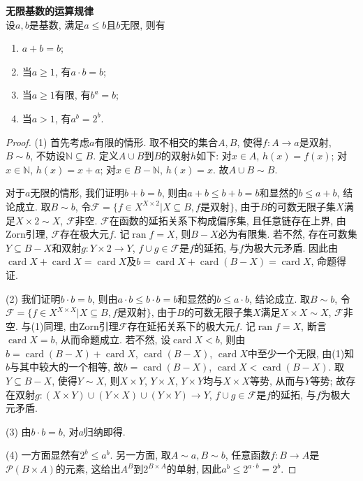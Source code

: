 \begin{pro}\textbf{无限基数的运算规律}\\
设$a,b$是基数, 满足$a\le b$且$b$无限, 则有
\begin{enumerate}
\item $a+b=b$;
\item 当$a\ge 1$, 有$a\cdot b=b$;
\item 当$a\ge 1$有限, 有$b^a=b$;
\item 当$a>1$, 有$a^b=2^b$.
\end{enumerate}
\end{pro}
\begin{proof}
(1) 首先考虑$a$有限的情形. 取不相交的集合$A,B$, 使得$f: A\to a$是双射, $B\sim b$, 不妨设$\mathbb{N}\subseteq B$. 定义$A\cup B$到$B$的双射$h$如下: 对$x\in A$, $h(x)=f(x)$; 对$x\in \mathbb{N}$, $h(x)=x+a$; 对$x\in B-\mathbb{N}$, $h(x)=x$. 故$A\cup B\sim B$.
\par 对于$a$无限的情形, 我们证明$b+b=b$, 则由$a+b\le b+b=b$和显然的$b\le a+b$, 结论成立. 取$B\sim b$, 令$\mathcal{F}=\{f\in X^{X\times 2}\vert X\subseteq B, f\text{是双射}\}$, 由于$B$的可数无限子集$X$满足$X\times 2 \sim X$, $\mathcal{F}$非空. $\mathcal{F}$在函数的延拓关系下构成偏序集, 且任意链存在上界, 由Zorn引理, $\mathcal{F}$存在极大元$f$. 记$\operatorname{ran}f=X$, 则$B-X$必为有限集. 若不然, 存在可数集$Y\subseteq B-X$和双射$g:Y\times 2\to Y$, $f\cup g\in \mathcal{F}$是$f$的延拓, 与$f$为极大元矛盾. 因此由$\operatorname{card}X+\operatorname{card}X=\operatorname{card}X$及$b=\operatorname{card}X+\operatorname{card}(B-X)=\operatorname{card}X$, 命题得证. 
\par (2) 我们证明$b\cdot b=b$, 则由$a\cdot b\le b\cdot b=b$和显然的$b\le a\cdot b$, 结论成立. 取$B\sim b$, 令$\mathcal{F}=\{f\in X^{X\times X}\vert X\subseteq B, f\text{是双射}\}$, 由于$B$的可数无限子集$X$满足$X\times X \sim X$, $\mathcal{F}$非空. 与(1)同理, 由Zorn引理$\mathcal{F}$存在延拓关系下的极大元$f$. 记$\operatorname{ran}f=X$, 断言$\operatorname{card}X=b$, 从而命题成立. 若不然, 设$\operatorname{card}X<b$, 则由$b=\operatorname{card}(B-X)+\operatorname{card}X$, $\operatorname{card}(B-X)$, $\operatorname{card}X$中至少一个无限, 由(1)知$b$与其中较大的一个相等, 故$b=\operatorname{card}(B-X)$, $\operatorname{card}X<\operatorname{card}(B-X)$. 取$Y\subseteq B-X$, 使得$Y\sim X$, 则$X\times Y$, $Y\times X$, $Y\times Y$均与$X\times X$等势, 从而与$Y$等势; 故存在双射$g:(X\times Y) \cup (Y\times X) \cup (Y\times Y) \to Y$, $f\cup g\in \mathcal{F}$是$f$的延拓, 与$f$为极大元矛盾.
\par (3) 由$b\cdot b=b$, 对$a$归纳即得. 
\par (4) 一方面显然有$2^b\le a^b$. 另一方面, 取$A\sim a, B\sim b$, 任意函数$f:B\to A$是$\mathcal{P}(B\times A)$的元素, 这给出$A^B$到$2^{B\times A}$的单射, 因此$a^b\le 2^{a\cdot b}=2^b$. 
\end{proof}

